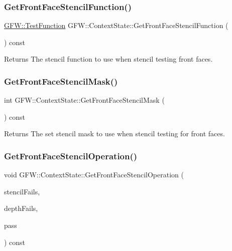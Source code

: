 \subsubsection{\texorpdfstring{Get\+Front\+Face\+Stencil\+Function()}{GetFrontFaceStencilFunction()}}
{\footnotesize\ttfamily \hyperlink{namespace_g_f_w_a2eabb5a646179bceaab2d5e3bfce2316}{G\+F\+W\+::\+Test\+Function} G\+F\+W\+::\+Context\+State\+::\+Get\+Front\+Face\+Stencil\+Function (\begin{DoxyParamCaption}{ }\end{DoxyParamCaption}) const}

\begin{DoxyReturn}{Returns}
The stencil function to use when stencil testing front faces. 
\end{DoxyReturn}
\mbox{\label{class_g_f_w_1_1_context_state_ad60fd3436d99fe95a85bff52d21d741b}} 
\subsubsection{\texorpdfstring{Get\+Front\+Face\+Stencil\+Mask()}{GetFrontFaceStencilMask()}}
{\footnotesize\ttfamily int G\+F\+W\+::\+Context\+State\+::\+Get\+Front\+Face\+Stencil\+Mask (\begin{DoxyParamCaption}{ }\end{DoxyParamCaption}) const}

\begin{DoxyReturn}{Returns}
The set stencil mask to use when stencil testing for front faces. 
\end{DoxyReturn}
\mbox{\label{class_g_f_w_1_1_context_state_a13f64606832754c2d39b19a1c3444305}} 
\subsubsection{\texorpdfstring{Get\+Front\+Face\+Stencil\+Operation()}{GetFrontFaceStencilOperation()}}
{\footnotesize\ttfamily void G\+F\+W\+::\+Context\+State\+::\+Get\+Front\+Face\+Stencil\+Operation (\begin{DoxyParamCaption}\item[{\hyperlink{namespace_g_f_w_a6a4cd1647d3100386320b711cdda20d4}{Test\+Operation} \&}]{stencil\+Fails,  }\item[{\hyperlink{namespace_g_f_w_a6a4cd1647d3100386320b711cdda20d4}{Test\+Operation} \&}]{depth\+Fails,  }\item[{\hyperlink{namespace_g_f_w_a6a4cd1647d3100386320b711cdda20d4}{Test\+Operation} \&}]{pass }\end{DoxyParamCaption}) const}

